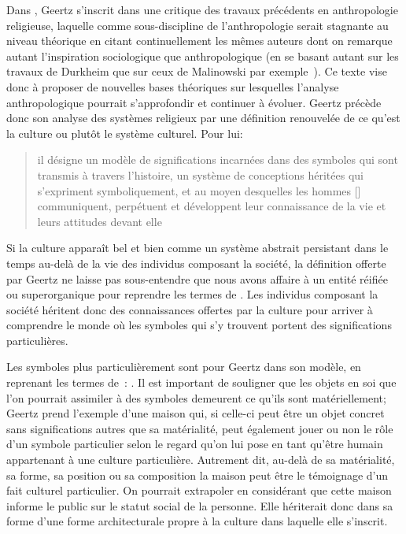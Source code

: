 Dans , Geertz s'inscrit dans une critique des travaux précédents en anthropologie religieuse, laquelle comme sous-discipline de l'anthropologie serait stagnante au niveau théorique en citant continuellement les mêmes auteurs dont on remarque autant l'inspiration sociologique que anthropologique (en se basant autant sur les travaux de Durkheim que sur ceux de Malinowski par exemple~\citep[20]{Geertz1972}). 
Ce texte vise donc à proposer de nouvelles bases théoriques sur lesquelles l'analyse anthropologique pourrait s'approfondir et continuer à évoluer. 
Geertz précède donc son analyse des systèmes religieux par une définition renouvelée de ce qu'est la culture ou plutôt le système culturel. 
Pour lui: \blockquote[{\cite[21]{Geertz1972}}][.]{\textelp{} il désigne
  un modèle de significations incarnées dans des symboles qui sont transmis à
  travers l'histoire, un système de conceptions héritées qui s'expriment
  symboliquement, et au moyen desquelles les hommes [] communiquent,
  perpétuent et développent leur connaissance de la vie et leurs attitudes
  devant elle}.

Si la culture apparaît bel et bien comme un système abstrait persistant dans le temps au-delà de la vie des individus composant la société, la définition offerte par Geertz ne laisse pas sous-entendre que nous avons affaire à un entité réifiée ou superorganique pour reprendre les termes de \citet{Duncan1980}. 
Les individus composant la société héritent donc des connaissances offertes par la culture pour arriver à comprendre le monde où les symboles qui s'y trouvent portent des significations particulières.

Les symboles plus particulièrement sont pour Geertz dans son modèle, en reprenant les termes de~\cite{Langer1962}: . 
Il est important de souligner que les objets en soi que l'on pourrait assimiler à des symboles demeurent ce qu'ils sont matériellement; Geertz prend l'exemple d'une maison qui, si celle-ci peut être un objet concret sans significations autres que sa matérialité, peut également jouer ou non le rôle d'un symbole particulier selon le regard qu'on lui pose en tant qu'être humain appartenant à une culture particulière. 
Autrement dit, au-delà de sa matérialité, sa forme, sa position ou sa composition la maison peut être le témoignage d'un fait culturel particulier. 
On pourrait extrapoler en considérant que cette maison informe le public sur le statut social de la personne. 
 Elle hériterait donc dans sa forme d'une forme architecturale propre à la culture dans laquelle elle s'inscrit.

